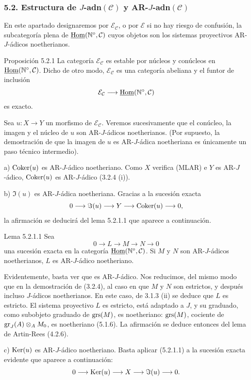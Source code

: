 \subsubsection*{5.2. Estructura de \(J\)-adn\((\mathcal C)\) y AR-\(J\)-adn\((\mathcal C)\)}

En este apartado designaremos por \(\mathcal E_{\mathcal C}\), o por \(\mathcal E\) si no hay riesgo de confusión, la subcategoría plena de \(\underline{\operatorname{Hom}}(\mathbb N^\circ,\mathcal C)\) cuyos objetos son los sistemas proyectivos AR-\(J\)-ádicos noetherianos.

\begin{statement}{Proposición 5.2.1}
La categoría \(\mathcal E_{\mathcal C}\) es estable por núcleos y conúcleos en \(\underline{\operatorname{Hom}}(\mathbb N^\circ,\mathcal C)\). Dicho de otro modo, \(\mathcal E_{\mathcal C}\) es una categoría abeliana y el funtor de inclusión
\[
\mathcal E_{\mathcal C}\longrightarrow \underline{\operatorname{Hom}}(\mathbb N^\circ,\mathcal C)
\]
es exacto.
\end{statement}

\begin{prooftext}
Sea \(u:X\to Y\) un morfismo de \(\mathcal E_{\mathcal C}\). Veremos sucesivamente que el conúcleo, la imagen y el núcleo de \(u\) son AR-\(J\)-ádicos noetherianos. (Por supuesto, la demostración de que la imagen de \(u\) es AR-\(J\)-ádica noetheriana es únicamente un paso técnico intermedio).

a) \(\operatorname{Coker}(u)\) es AR-\(J\)-ádico noetheriano. Como \(X\) verifica (MLAR) e \(Y\) es AR-\(J\)-ádico, \(\operatorname{Coker}(u)\) es AR-\(J\)-ádico (3.2.4 (i)).

b) \(\Im(u)\) es AR-\(J\)-ádica noetheriana. Gracias a la sucesión exacta
\[
0\longrightarrow \Im(u)\longrightarrow Y\longrightarrow \operatorname{Coker}(u)\longrightarrow 0,
\]
la afirmación se deducirá del lema 5.2.1.1 que aparece a continuación.
\end{prooftext}

\begin{statement}{Lema 5.2.1.1}
Sea
\[
0\longrightarrow L\longrightarrow M\longrightarrow N\longrightarrow0
\]
una sucesión exacta en la categoría \(\underline{\operatorname{Hom}}(\mathbb N^\circ,\mathcal C)\). Si \(M\) y \(N\) son AR-\(J\)-ádicos noetherianos, \(L\) es AR-\(J\)-ádico noetheriano.
\end{statement}

\begin{prooftext}
Evidentemente, basta ver que es AR-\(J\)-ádico. Nos reducimos, del mismo modo que en la demostración de (3.2.4), al caso en que \(M\) y \(N\) son estrictos, y después incluso \(J\)-ádicos noetherianos. En este caso, de 3.1.3 (ii) se deduce que \(L\) es estricto. El sistema proyectivo \(L\) es estricto, está adaptado a \(J\), y su graduado, como subobjeto graduado de \(\operatorname{grs}(M)\), es noetheriano: \(\operatorname{grs}(M)\), cociente de \(\operatorname{gr}_J(A)\otimes_A M_0\), es noetheriano (5.1.6). La afirmación se deduce entonces del lema de Artin-Rees (4.2.6).
\end{prooftext}

c) \(\operatorname{Ker}(u)\) es AR-\(J\)-ádico noetheriano. Basta aplicar (5.2.1.1) a la sucesión exacta evidente que aparece a continuación:
\[
0\longrightarrow \operatorname{Ker}(u)\longrightarrow X\longrightarrow \Im(u)\longrightarrow0.
\]
